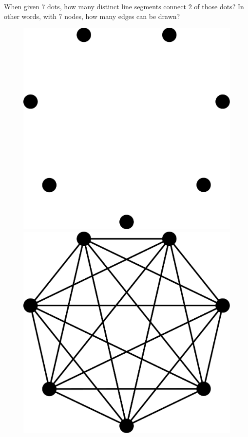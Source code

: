 \begin{frame}
When given 7 dots, how many distinct line segments connect 2 of those dots? In other words, with 7 nodes, how many edges can be drawn?

\begin{figure}
    \begin{overprint}
    \centering\includegraphics[scale=0.3]{3-4_binomial_distribution/figures/stars/dots_7.pdf}
    \centering\includegraphics[scale=0.3]{3-4_binomial_distribution/figures/stars/dots_7_solution.pdf}
    \end{overprint}
\end{figure}

\end{frame} 



